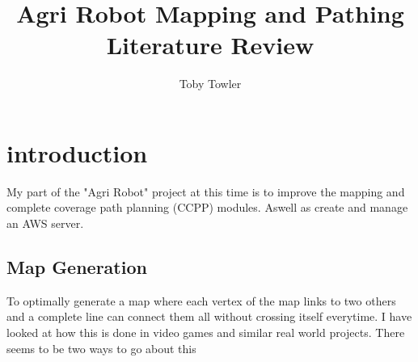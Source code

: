 \documentclass[review]{cmpreport}
\title{Agri Robot Mapping and Pathing Literature Review}
\author{Toby Towler}
\begin{document}
	\section{introduction}
	
	My part of the "Agri Robot" project at this time is to improve the mapping and complete coverage path planning (CCPP) modules. Aswell as create and manage an AWS server. 
	\subsection{Map Generation}
	To optimally generate a map where each vertex of the map links to two others and a complete line can connect them all without crossing itself everytime. I have looked at how this is done in video games and similar real world projects. There seems to be two ways to go about this
    
	
	
\end{document}
